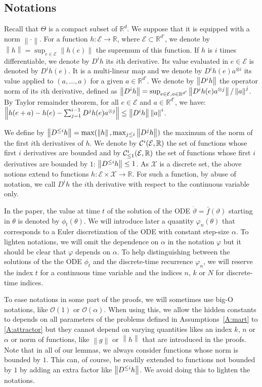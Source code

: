 \documentclass{article}
\newcommand{\R}{\mathbb{R}}
\newcommand{\calX}{\mathcal{X}}
\newcommand{\calE}{\mathcal{E}}
\newcommand\norm[1]{\left\|#1\right\|}
\newcommand\bO[1]{\mathcal{O}(#1)}
\newcommand\normopexact[2][]{\norm{D^{\ifthenelse{\equal{#1}{}}{}{#1}}#2}}
\newcommand\normop[2][]{\norm{D^{\ifthenelse{\equal{#1}{}}{}{\le #1}}#2}}
\newcommand\cont[3][]{\mathcal{C}^{#2}_{\ifthenelse{\equal{#1}{all}}{}{\le1}}(#3,\R)}
\begin{document}
\subsection{Notations}

Recall that $\Theta$ is a compact subset of $\R^d$. We suppose that it is equipped with a norm $\norm{\cdot}$. For a function $h:\calE\to\R$, where $\calE\subset\R^{d'}$, we denote by $\norm{h}=\sup_{e\in\calE}\norm{h(e)}$ the supremum of this function. If $h$ is $i$ times differentiable, we denote by $D^ih$ its $i$th derivative. Its value evaluated in $e\in\calE$ is denoted by $D^ih(e)$. It is a multi-linear map and we denote by $D^ih(e) a^{\otimes i}$ its value applied to $(a,\dots, a)$ for a given $a\in \R^{d'}$. We denote by $\normopexact[i]{h}$ the operator norm of its $i$th derivative, defined as $\normopexact[i]{h} = \sup_{e\in\calE,a\in\R^{d'}}\norm{D^ih(e)a^{\otimes j}}/\norm{a}^j$.  By Taylor remainder theorem, for all $e\in\calE$ and $a\in\R^{d'}$, we have:
$%
    \norm{h(e+a) - h(e) - \sum_{j=1}^{i-1} D^jh(e) a^{\otimes j}}\le \normopexact[i]{h}  \norm{a}^i$.

We define by $\normop[i]{h}=\max(\norm{h},\max_{j\le i}\normopexact[j]{h})$ the maximum of the norm of the first $i$th derivatives of $h$. We denote by $\cont[all]{i}{\calE}$ the set of functions whose first $i$ derivatives are bounded and by $\cont{i}{\calE}$ the set of functions whose first $i$ derivatives are bounded by $1$: $\normop[i]{h}\le1$. As $\calX$ is a discrete set, the above notions extend to functions $h:\calE\times\calX\to\R$. For such a function, by abuse of notation, we call $D^ih$ the $i$th derivative with respect to the continuous variable only.

In the paper, the value at time $t$ of the solution of the ODE $\dot{\vartheta}=\bar{f}(\vartheta)$ starting in $\theta$ is denoted by $\phi_t(\theta)$. We will introduce later a quantity $\varphi_n(\theta)$ that corresponds to a Euler discretization of the ODE with constant step-size $\alpha$. To lighten notations, we will omit the dependence on $\alpha$ in the notation $\varphi$ but it should be clear that $\varphi$ depends on $\alpha$.  To help distinguishing between the solutions of the the ODE $\phi_t$ and the discrete-time recurrence $\varphi_n$, we will reserve the index $t$ for a continuous time variable and the indices $n$, $k$ or $N$ for discrete-time indices.

To ease notations in some part of the proofs, we will sometimes use big-O notations, like $\bO{1}$ or $\bO{\alpha}$. When using this, we allow the hidden constants to depends on all parameters of the problems defined in Assumptions~\ref{A:mart} to \ref{A:attractor} but they cannot depend on varying quantities likes an index $k$, $n$ or $\alpha$ or norm of functions, like $\norm{g}$ or $\norm{h}$ that are introduced in the proofs. Note that in all of our lemmas, we always consider functions whose norm is bounded by $1$. This can, of course, be readily extended to functions not bounded by $1$ by adding an extra factor like $\normop[i]{h}$. We avoid doing this to lighten the notations.
\end{document}
